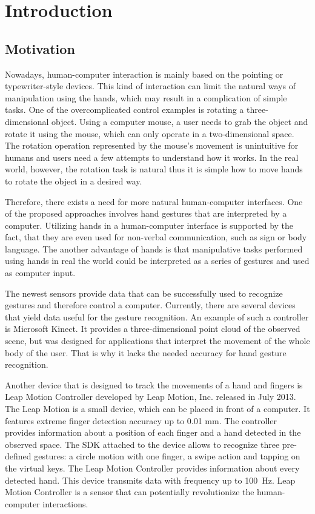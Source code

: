 \chapter{Introduction}\label{introChapter}

\section{Motivation}

Nowadays, human-computer interaction is mainly based on the pointing or typewriter-style devices. 
This kind of interaction can limit the natural ways of manipulation using the hands, which may result in a complication of simple tasks.
One of the overcomplicated control examples is rotating a three-dimensional object.
Using a computer mouse, a user needs to grab the object and rotate it using the mouse, which can only operate in a two-dimensional space. 
The rotation operation represented by the mouse's movement is unintuitive for humans and users need a few attempts to understand how it works. 
In the real world, however, the rotation task is natural thus it is simple how to move hands to rotate the object in a desired way.

Therefore, there exists a need for more natural human-computer interfaces.
One of the proposed approaches involves hand gestures that are interpreted by a computer.
Utilizing hands in a human-computer interface is supported by the fact, that they are even used for non-verbal communication, such as sign or body language.
The another advantage of hands is that manipulative tasks performed using hands in real the world could be interpreted as a series of gestures and used as computer input.

The newest sensors provide data that can be successfully used to recognize gestures and therefore control a computer.
Currently, there are several devices that yield data useful for the gesture recognition. 
An example of such a controller is Microsoft Kinect.
It provides a three-dimensional point cloud of the observed scene, but was designed for applications that interpret the movement of the whole body of the user. 
That is why it lacks the needed accuracy for hand gesture recognition.
 
Another device that is designed to track the movements of a hand and fingers is Leap Motion Controller developed by Leap Motion, Inc. released in July 2013. 
The Leap Motion is a small device, which can be placed in front of a computer. It features extreme finger detection accuracy up to 0.01 mm. 
The controller provides information about a position of each finger and a hand detected in the observed space.
The SDK attached to the device allows to recognize three pre-defined gestures: a circle motion with one finger, a swipe action and tapping on the virtual keys. 
The Leap Motion Controller provides information about every detected hand. This device transmits data with frequency up to 100~Hz. 
Leap Motion Controller is a sensor that can potentially revolutionize the human-computer interactions. 

